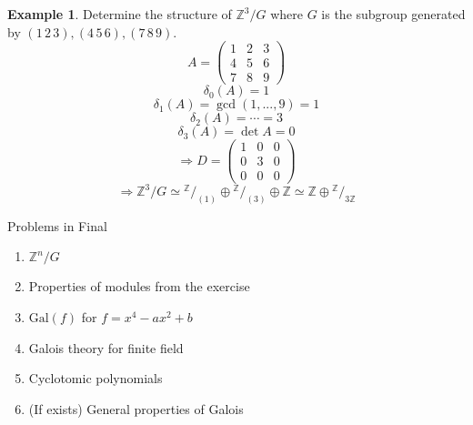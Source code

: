 \documentclass{article}
\theoremstyle{definition}
\newtheorem{ex}{Example}
\newcommand*\quot[2]{{^{\textstyle #1}\big/_{\textstyle #2}}}
\newcommand{\ZZ}{\mathbb Z}
\newcommand{\Ra}{\Rightarrow}
\newcommand{\Gal}{\text{Gal}}
\begin{document}
\begin{ex}
	Determine the structure of $\ZZ^3/G$ where $G$ is the subgroup generated by $(1 \, 2 \, 3), (4 \, 5 \, 6), (7 \, 8 \, 9)$.
	\[
		A = 
		\begin{pmatrix}
			1 & 2 & 3\\
			4 & 5 & 6\\
			7 & 8 & 9
		\end{pmatrix}
	\]
	\[
		\delta_0(A) = 1
	\]
	\[
		\delta_1(A) = \gcd(1, ..., 9) = 1
	\]
	\[
		\delta_2(A) = \cdots = 3
	\]
	\[
		\delta_3(A) = \det A = 0
	\]
	\[
		\Ra D = 
		\begin{pmatrix}
			1 & 0 & 0\\
			0 & 3 & 0\\
			0 & 0 & 0
		\end{pmatrix}
	\]
	\[
		\Ra \ZZ^3/G \simeq \quot{\ZZ}{(1)} \oplus \quot{\ZZ}{(3)} \oplus \ZZ \simeq \ZZ \oplus \quot{\ZZ}{3 \ZZ}
	\]
\end{ex}

Problems in Final
\begin{enumerate}
	\item $\ZZ^n/G$

	\item Properties of modules from the exercise

	\item $\Gal(f)$ for $f = x^4 - ax^2 + b$

	\item Galois theory for finite field

	\item Cyclotomic polynomials

	\item (If exists) General properties of Galois
\end{enumerate}
\end{document}
